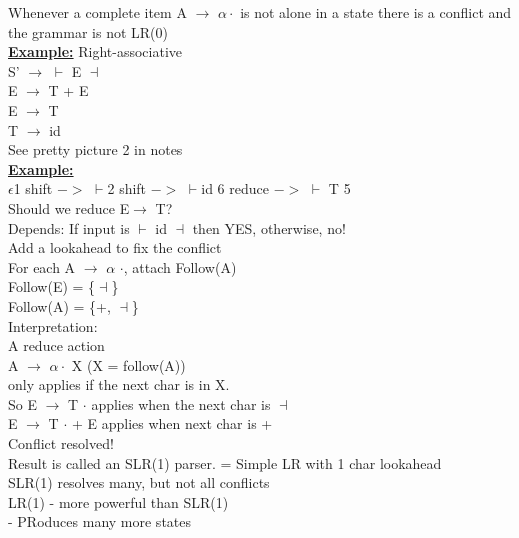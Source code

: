 \documentclass[12pt]{article}
\newcommand{\myt}[1]{\textbf{\underline{#1}}}
\begin{document}
	Whenever a complete item A $\rightarrow$ $\alpha \cdot$ is not alone in a state there is a conflict and the grammar is not LR(0)\\
	
	\myt{Example:} Right-associative\\
	S' $\rightarrow$ $\vdash$ E $\dashv$\\
	E $\rightarrow$ T + E\\
	E $\rightarrow$ T \\
	T $\rightarrow$ id\\
	
	See pretty picture 2 in notes\\
	
	\myt{Example:}\\
	$\epsilon$1 shift $->$ $\vdash$2 shift $->$ $\vdash$id 6 reduce $->$ $\vdash$ T 5\\
	
	Should we reduce E$\rightarrow$ T?\\
	Depends: If input is $\vdash$ id $\dashv$ then YES, otherwise, no!\\
	
	Add a lookahead to fix the conflict\\
	
	For each A $\rightarrow$ $\alpha$ $\cdot$, attach Follow(A)\\
	Follow(E) = \{$\dashv$\}\\
	Follow(A) = \{+, $\dashv$\}\\
	
	Interpretation:\\
	A reduce action \\
	A $\rightarrow$ $\alpha \cdot$ X (X = follow(A))\\
	only applies if the next char is in X.\\
	
	So E $\rightarrow$ T $\cdot$ applies when the next char is $\dashv$\\
	E $\rightarrow$ T $\cdot$ + E applies when next char is +\\
	
	Conflict resolved!\\
	Result is called an SLR(1) parser. = Simple LR with 1 char lookahead\\
	
	SLR(1) resolves many, but not all conflicts\\
	
	LR(1) - more powerful than SLR(1)\\
	- PRoduces many more states\\
	
\end{document}

